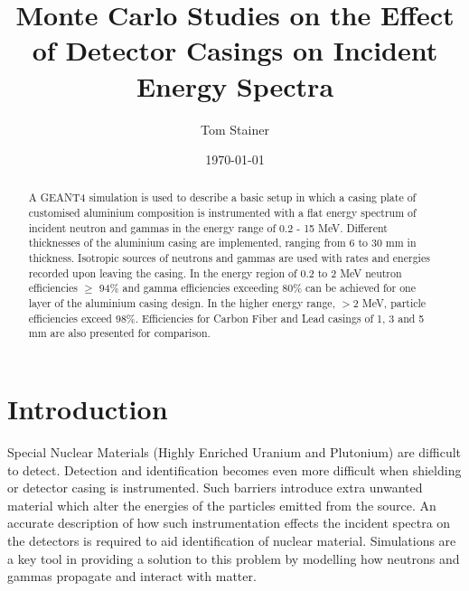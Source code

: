 \documentclass{article}
\title{Monte Carlo Studies on the Effect of Detector Casings on Incident Energy Spectra} %
\author{Tom Stainer} %
\date{\today} %
\begin{document}
\maketitle %

\begin{abstract}A GEANT4 simulation is used to describe a basic setup in which a casing plate of customised aluminium composition is instrumented with a flat energy spectrum of incident neutron and gammas in the energy range of 0.2 - 15 MeV. Different thicknesses of the aluminium casing are implemented, ranging from 6 to 30 mm in thickness. Isotropic sources of neutrons and gammas are used with rates and energies recorded upon leaving the casing. In the energy region of 0.2 to 2 MeV neutron efficiencies $\geq$ 94\% and gamma efficiencies exceeding 80\% can be achieved for one layer of the aluminium casing design. In the higher energy range, $>$2 MeV, particle efficiencies exceed 98\%. Efficiencies for Carbon Fiber and Lead casings of 1, 3 and 5 mm are also presented for comparison.
\end{abstract}

\newpage

\section{Introduction}
Special Nuclear Materials (Highly Enriched Uranium and Plutonium) are difficult to detect. Detection and identification becomes even more difficult when shielding or detector casing is instrumented. Such barriers introduce extra unwanted material which alter the energies of the particles emitted from the source. An accurate description of how such instrumentation effects the incident spectra on the detectors is required to aid identification of nuclear material. Simulations are a key tool in providing a solution to this problem by modelling how neutrons and gammas propagate and interact with matter.


\end{document}

